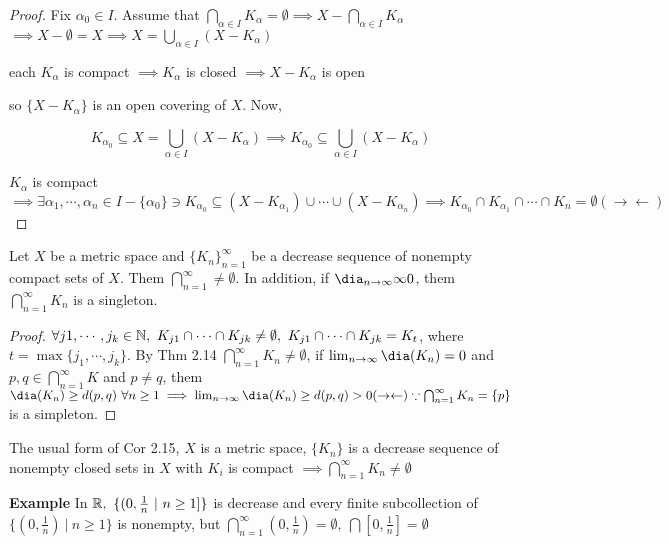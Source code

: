 \begin{proof}
	Fix $\alpha_0 \in I$. Assume that $\bigcap_{\alpha \in I}K_{\alpha} = \emptyset \implies X - \bigcap_{\alpha \in I}K_{\alpha}$\\$\implies X - \emptyset = X \implies X = \bigcup_{\alpha \in I}(X - K_{\alpha})$
	
	each $K_{\alpha}$ is compact $\implies K_{\alpha}$ is closed $\implies X - K_{\alpha}$ is open
	
	so $\{X - K_{\alpha}\}$ is an open covering of $X$. Now,
	
	$$K_{\alpha_0} \subseteq X = \bigcup_{\alpha \in I}(X - K_{\alpha}) \implies K_{\alpha_0} \subseteq \bigcup_{\alpha \in I}(X - K_{\alpha})$$
	
	$K_{\alpha}$ is compact $\implies \exists \alpha_1,\cdots,\alpha_n \in I - \{\alpha_0\} \ni K_{\alpha_0} \subseteq (X - K_{\alpha_1})\cup \cdots \cup (X - K_{\alpha_n}) \implies K_{\alpha_0} \cap K_{\alpha_1}\cap \cdots \cap K_n = \emptyset (\rightarrow \leftarrow)$
\end{proof}

\begin{cor}
	Let $X$ be a metric space and $\{K_n\}^{\infty}_{n=1}$ be a decrease sequence of nonempty compact sets of $X$. Them $\bigcap^{\infty}_{n=1} \neq \emptyset$. In addition, if $\dia_{n \rightarrow \infty} \infty 0$, them $\bigcap^{\infty}_{n=1}K_n$ is a singleton.
\end{cor}

\begin{proof}
	$\forall j1,\cdots,j_k \in \mathbb{N},~K_{j1}\cap \cdots \cap K_{jk} \neq \emptyset,~K_{j1}\cap\cdots \cap K_{jk} = K_t$, where $t = \max \{j_1,\cdots,j_k\}$. By Thm 2.14 $\bigcap^{\infty}_{n = 1}K_n \neq \emptyset$, if $\lim_{n \rightarrow \infty}\dia(K_n) = 0$ and $p,q \in \bigcap^{\infty}_{n=1}K$ and $p \neq q$, them $\dia(K_n) \geq d(p,q) ~\forall n \geq 1 \implies \lim_{n \rightarrow \infty}\dia(K_n) \geq d(p,q) > 0 (\rightarrow\leftarrow) \because \bigcap^{\infty}_{n = 1}K_n = \{p\}$ is a simpleton.
\end{proof}

\begin{rmk*}
	The usual form of Cor 2.15, $X$ is a metric space, $\{K_n\}$ is a decrease sequence of nonempty closed sets in $X$ with $K_i$ is compact $\implies \bigcap^{\infty}_{n=1}K_n \neq \emptyset$
\end{rmk*}

\textbf{Example} In $\mathbb{R},~ \{(0,\frac{1}{n}~|~n \geq 1]\}$ is decrease and every finite subcollection of $\{(0,\frac{1}{n})~|~ n \geq 1\}$ is nonempty, but $\bigcap^{\infty}_{n = 1} (0,\frac{1}{n})= \emptyset,~\bigcap[0,\frac{1}{n}] = \emptyset$
\setcounter{thm}{16}

